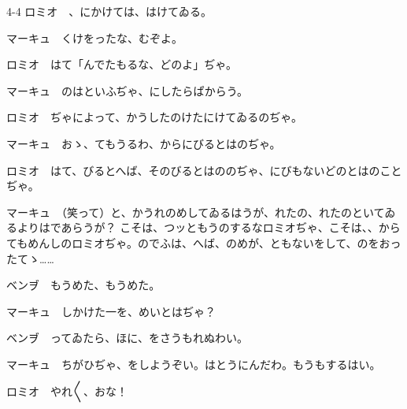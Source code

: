 \documentclass[tate,paper=b6j,jafontsize=9pt]{jlreq}
\begin{document}
\begin{azconvIndented}{4\zw}{-4\zw}
ロミオ　、にかけては、はけてゐる。

マーキュ　くけをったな、むぞよ。

ロミオ　はて「んでたもるな、どのよ」ぢゃ。

マーキュ　のはといふぢゃ、にしたらぱからう。

ロミオ　ぢゃによって、かうしたのけたにけてゐるのぢゃ。

マーキュ　おゝ、てもうるわ、からにびるとはのぢゃ。

ロミオ　はて、びるとへば、そのびるとはののぢゃ、にびもないどのとはのことぢゃ。

マーキュ　（笑って）と、かうれのめしてゐるはうが、れたの、れたのといてゐるよりはであらうが？ こそは、つッともうのするなロミオぢゃ、こそは、、からてもめんしのロミオぢゃ。のでふは、へば、のめが、ともないをして、のをおったてゝ……

ベンヺ　もうめた、もうめた。

マーキュ　しかけた一を、めいとはぢゃ？

ベンヺ　ってゐたら、ほに、をさうもれぬわい。

マーキュ　ちがひぢゃ、をしようぞい。はとうにんだわ。もうもするはい。

ロミオ　やれ{〳〵}、おな！

\end{azconvIndented}
\end{document}
